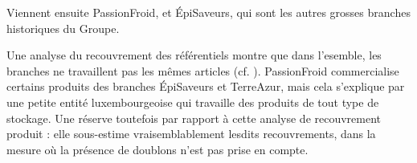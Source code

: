                 Viennent ensuite PassionFroid, et \'{E}piSaveurs, qui sont les autres \og grosses \fg branches historiques du Groupe.


                \begin{figure}[htbp]\CenterFloatBoxes
                    \begin{floatrow}
                    \end{floatrow}
                \end{figure}
                    
                Une analyse du recouvrement des référentiels montre que dans l'esemble, les branches ne travaillent pas les mêmes articles (cf. ).
                PassionFroid commercialise certains produits des branches \'{E}piSaveurs et TerreAzur, mais cela s'explique par une petite entité luxembourgeoise qui travaille des produits de tout type de stockage.
                Une réserve toutefois par rapport à cette analyse de recouvrement produit : elle sous-estime vraisemblablement lesdits recouvrements, dans la mesure où la présence de doublons n'est pas prise en compte.

